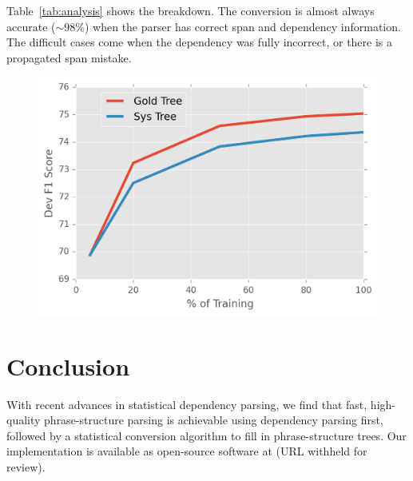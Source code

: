 \documentclass[11pt,letterpaper]{article}
\newcommand{\nascomment}[1]{\textcolor{blue}{\bf \small [#1 --nas]}}
\begin{document}
Table~\ref{tab:analysis} shows the breakdown. The
conversion is almost always accurate ($\sim$98\%) when the parser has correct span and
dependency information. The difficult cases come when the dependency
was fully incorrect, or there is a propagated span mistake. 
 






\begin{figure}
  \centering
  \includegraphics[scale=0.4]{../notebooks/data}
\label{fig:dataamo}
\end{figure}




\section{Conclusion}

With recent advances in statistical dependency parsing, we find that
fast, high-quality phrase-structure parsing is achievable using dependency
parsing first, followed by a statistical conversion algorithm to
fill in phrase-structure trees. 
Our implementation is available as open-source software at (URL
withheld for review).
\end{document}
